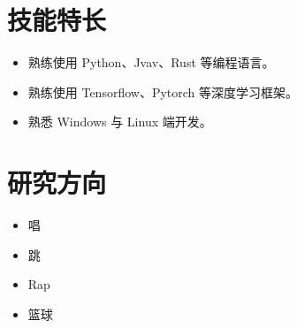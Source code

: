 \documentclass[11pt]{article}
\newlength{\iconwidth}
\begin{document}
    \begin{minipage}[t]{0.6\textwidth}
        \section[技能特长]{\makebox[\iconwidth][c]{\color{primary_color}{\faWrench}}\quad 技能特长}
        \begin{itemize}
        \setlength{\itemsep}{0.5em}
            \item 熟练使用 Python、Jvav、Rust 等编程语言。
            \item 熟练使用 Tensorflow、Pytorch 等深度学习框架。
            \item 熟悉 Windows 与 Linux 端开发。
        \end{itemize}
    \end{minipage}
    \hfill
     \begin{minipage}[t]{0.35\textwidth}
        \section[研究方向]{\makebox[\iconwidth][c]{\color{primary_color}{\faStar}}\quad 研究方向}
        \begin{itemize}
        \setlength{\itemsep}{0.5em}
            \item 唱
            \item 跳
            \item Rap
            \item 篮球
        \end{itemize}
    \end{minipage}
    
\end{document}
